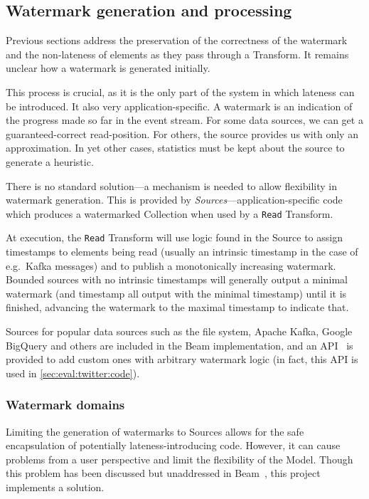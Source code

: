 \subsection{Watermark generation and processing}\label{sec:impl:dataflow:watermark-generation}


Previous sections address the preservation of the correctness of the watermark and the non-lateness of elements as they pass through a Transform.
It remains unclear how a watermark is generated initially.

This process is crucial, as it is the only part of the system in which lateness can be introduced.
It also very application-specific.
A watermark is an indication of the progress made so far in the event stream.
For some data sources, we can get a guaranteed-correct read-position.
For others, the source provides us with only an approximation.
In yet other cases, statistics must be kept about the source to generate a heuristic.

There is no standard solution---a mechanism is needed to allow flexibility in watermark generation.
This is provided by \emph{Sources}---application-specific code which produces a watermarked Collection when used by a \verb|Read| Transform.

At execution, the \verb|Read| Transform will use logic found in the Source to assign timestamps to elements being read (usually an intrinsic timestamp in the case of e.g.\ Kafka messages) and to publish a monotonically increasing watermark.
Bounded sources with no intrinsic timestamps will generally output a minimal watermark (and timestamp all output with the minimal timestamp) until it is finished, advancing the watermark to the maximal timestamp to indicate that.

Sources for popular data sources such as the file system, Apache Kafka, Google BigQuery and others are included in the Beam implementation, and an API~\cite{BEAM-code-SourceAPI} is provided to add custom ones with arbitrary watermark logic (in fact, this API is used in \cref{sec:eval:twitter:code}).

\subsubsection{Watermark domains}

Limiting the generation of watermarks to Sources allows for the safe encapsulation of potentially lateness-introducing code.
However, it can cause problems from a user perspective and limit the flexibility of the Model.
Though this problem has been discussed but unaddressed in Beam~\cite{Beam-JIRA-watermark-domains}, this project implements a solution.

